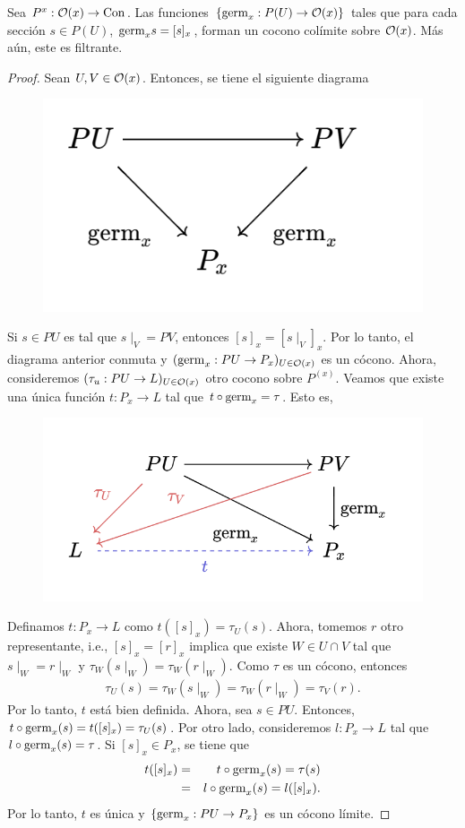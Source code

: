 \begin{lema}
    Sea $P^x:{\mathcal O}(x)\to{\mathrm{Con}}$. Las funciones $\{{\mathrm{germ}}_x: P(U)\to{\mathcal O}(x)\}$ tales que para cada sección $s\in P(U)$, ${\mathrm{germ}}_xs=[s]_x$, forman un cocono colímite sobre ${\mathcal O}(x)$. Más aún, este es filtrante.
\end{lema}
\begin{proof}
    Sean $U,V\in{\mathcal O}(x)$. Entonces, se tiene el siguiente diagrama
    \begin{figure}[H]
        \centering
        \includegraphics[width=0.3\linewidth]{img/diagram_2.3.1.png}
    \end{figure}
    Si $s\in PU$ es tal que $s\mid_V=PV$, entonces $[s]_x=[s\mid_V]_x$. Por lo tanto, el diagrama anterior conmuta y $({\mathrm{germ}}_x:PU\to P_x)_{U\in {\mathcal O}(x)}$ es un cócono. Ahora, consideremos $(\tau_u: PU\to L)_{U\in{\mathcal O}(x)}$ otro cocono sobre $P^{(x)}$. Veamos que existe una única función $t:P_x\to L$ tal que $t\circ{\mathrm{germ}}_x=\tau$. Esto es, 
    \begin{figure}[H]
        \centering
        \includegraphics[width=0.45\linewidth]{img/diagram2.3.2.png}
    \end{figure}
    Definamos $t:P_x\to L$ como $t([s]_x)=\tau_U(s)$. Ahora, tomemos $r$ otro representante, i.e., $[s]_x=[r]_x$ implica que existe $W\in U\cap V$ tal que $s\mid_W=r\mid_W$ y $\tau_W(s\mid_W)=\tau_W(r\mid_W)$. Como $\tau$ es un cócono, entonces 
    \begin{eqnarray*}
    \tau_U(s)=\tau_W(s\mid_W)=\tau_W(r\mid_W)=\tau_V(r).
    \end{eqnarray*}
    Por lo tanto, $t$ está bien definida. Ahora, sea $s\in PU$. Entonces, $t\circ{\mathrm{germ}}_x(s)=t([s]_x)=\tau_U(s)$. Por otro lado, consideremos $l:P_x\to L$ tal que $l\circ{\mathrm{germ}}_x(s)=\tau$. Si $[s]_x\in P_x$, se tiene que
    \begin{eqnarray*}
        t([s]_x)&=& t\circ{\mathrm{germ}}_x(s)=\tau(s)\\
        &=& l\circ{\mathrm{germ}}_x(s)=l([s]_x).
    \end{eqnarray*}
    Por lo tanto, $t$ es única y $\{{\mathrm{germ}}_x:PU\to P_x\}$ es un cócono límite.
\end{proof}
